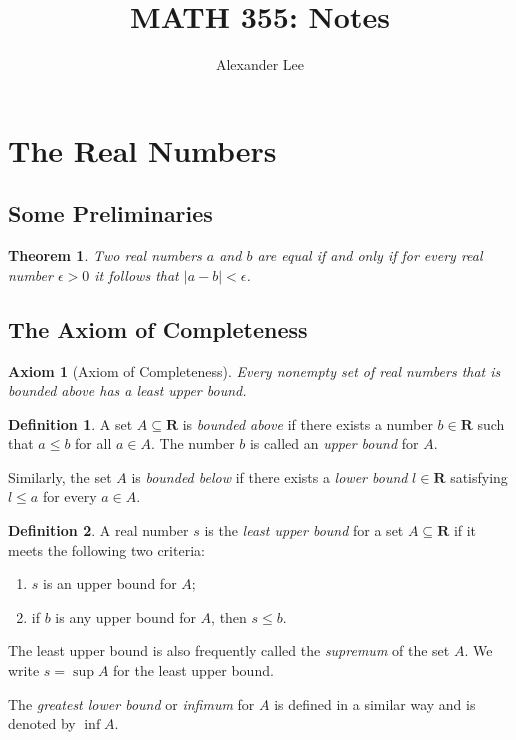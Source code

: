 \documentclass{amsart}
\title{MATH 355: Notes}
\author{Alexander Lee}
\newtheorem*{theorem}{Theorem}
\newtheorem*{axiom}{Axiom}
\theoremstyle{definition}
\newtheorem*{definition}{Definition}
\newcommand{\R}{\mathbf{R}}
\newcommand{\abs}[1]{|#1|}
\begin{document}
\maketitle

\section*{The Real Numbers}

\subsection*{Some Preliminaries}

\begin{theorem}
  Two real numbers $a$ and $b$ are equal if and only if for every real number
  $\epsilon > 0$ it follows that $\abs{a-b} < \epsilon$.
\end{theorem}

\subsection*{The Axiom of Completeness}

\begin{axiom}[Axiom of Completeness]
  Every nonempty set of real numbers that is bounded above has a least upper
  bound.
\end{axiom}

\begin{definition}
  A set $A \subseteq \R$ is \emph{bounded above} if there exists a number $b \in
  \R$ such that $a \le b$ for all $a \in A$. The number $b$ is called an
  \emph{upper bound} for $A$.

  Similarly, the set $A$ is \emph{bounded below} if there exists a \emph{lower
  bound} $l \in \R$ satisfying $l \le a$ for every $a \in A$.
\end{definition}

\begin{definition}
  A real number $s$ is the \emph{least upper bound} for a set $A \subseteq \R$
  if it meets the following two criteria:
  \begin{enumerate}[label={(\roman*)}]
    \item $s$ is an upper bound for $A$;
    \item if $b$ is any upper bound for $A$, then $s \le b$.
  \end{enumerate}
  The least upper bound is also frequently called the \emph{supremum} of the set
  $A$. We write $s = \sup{A}$ for the least upper bound.

  The \emph{greatest lower bound} or \emph{infimum} for $A$ is defined in a
  similar way and is denoted by $\inf{A}$.
\end{definition}
\end{document}

